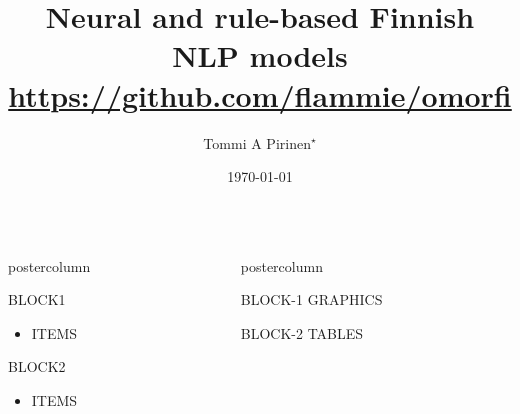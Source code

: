 \documentclass[final,hyperref={pdfpagelabels}]{beamer}
\title[Finnish neural NLP]{{\huge Neural and rule-based Finnish NLP models}\\
\url{https://github.com/flammie/omorfi}}
\author[tommi.antero.pirinen@uni-hamburg.de]{Tommi A Pirinen$^\star$ }
\institute[UHH-HZSK]{$^\star$ Universität Hamburg,Hamburger Zentrumb für
Sprachkorpora}
\date{\today}
\newlength{\columnheight}
\begin{document}
\begin{frame}
      \maketitle
      \begin{columns}
      \begin{column}{.49\textwidth}
      \begin{beamercolorbox}[center,wd=\textwidth]{postercolumn}
          \begin{minipage}[T]{.95\textwidth}  %
          \parbox[t][\columnheight]{\textwidth}{ %
        \begin{block}{BLOCK1}
            \begin{itemize}
                \item ITEMS
            \end{itemize}
        \end{block}

        \begin{block}{BLOCK2}
            \begin{itemize}
                \item ITEMS
            \end{itemize}
        \end{block}

         }
        \end{minipage}
      \end{beamercolorbox}
  \end{column}

   \begin{column}{.49\textwidth}
      \begin{beamercolorbox}[center,wd=\textwidth]{postercolumn}
        \begin{minipage}[T]{.95\textwidth} %
          \parbox[t][\columnheight]{\textwidth}{ %

        \begin{block}{BLOCK-1}
            GRAPHICS
        \end{block}

        \begin{block}{BLOCK-2}
            TABLES
        \end{block}

         }
        \end{minipage}
      \end{beamercolorbox}
    \end{column}
  \end{columns}

  \end{frame}
\end{document}
